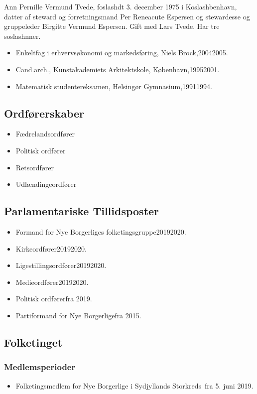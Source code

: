 \documentclass[11pt, a4paper]{awesome-cv}
\begin{document}
\makecvheader[R]
\makelettertitle
\begin{cvletter}
Ann Pernille Vermund Tvede, foslashdt 3. december 1975 i Koslashbenhavn, datter af steward og forretningsmand Per Reneacute Espersen og stewardesse og gruppeleder Birgitte Vermund Espersen. Gift med Lars Tvede. Har tre soslashnner.

\begin{itemize}
\item Enkeltfag i erhvervsøkonomi og markedsføring, Niels Brock,20042005.
\item Cand.arch., Kunstakademiets Arkitektskole, København,19952001.
\item Matematisk studentereksamen, Helsingør Gymnasium,19911994.
\end{itemize}
\subsection*{Ordførerskaber}
\begin{itemize}
\item Fædrelandsordfører
\item Politisk ordfører
\item Retsordfører
\item Udlændingeordfører
\end{itemize}
\subsection*{Parlamentariske Tillidsposter}
\begin{itemize}
\item Formand for Nye Borgerliges folketingsgruppe20192020.
\item Kirkeordfører20192020.
\item Ligestillingsordfører20192020.
\item Medieordfører20192020.
\item Politisk ordførerfra 2019.
\item Partiformand for Nye Borgerligefra 2015.
\end{itemize}
\subsection*{Folketinget}
\subsubsection*{Medlemsperioder}
\begin{itemize}
\item Folketingsmedlem for Nye Borgerlige i Sydjyllands Storkreds fra 5. juni 2019.
\end{itemize}

\end{cvletter}
\end{document}
